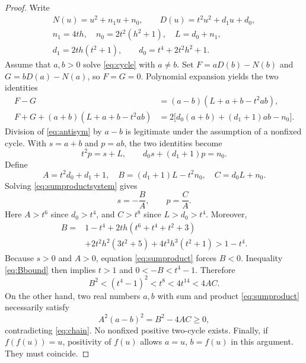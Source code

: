 \documentclass[11pt,a4paper]{article}
\numberwithin{equation}{section}
\begin{document}
\begin{proof}
Write
\begin{equation}
\begin{gathered}
 N(u)=u^2+n_1u+n_0,\qquad D(u)=t^2u^2+d_1u+d_0,\\
 n_1=4th,\quad n_0=2t^2(h^2+1),\quad L=d_0+n_1,\\
 d_1=2th(t^2+1),\qquad d_0=t^4+2t^2h^2+1.
\end{gathered}
\label{eq:coefficients}
\end{equation}
Assume that $a,b>0$ solve \eqref{eq:cycle} with $a\ne b$.
Set $F=aD(b)-N(b)$ and $G=bD(a)-N(a)$, so $F=G=0$.
Polynomial expansion yields the two identities
\begin{align}
 F-G&=(a-b)(L+a+b-t^2ab),\label{eq:antisym}\\
 F+G+(a+b)(L+a+b-t^2ab)
   &=2\bigl[d_0(a+b)+(d_1+1)ab-n_0\bigr].
 \label{eq:sym}
\end{align}
Division of \eqref{eq:antisym} by $a-b$ is legitimate under the
assumption of a nonfixed cycle. With $s=a+b$ and $p=ab$, the two
identities become
\begin{equation}
 t^2p=s+L,\qquad d_0s+(d_1+1)p=n_0.
 \label{eq:sumproductsystem}
\end{equation}
Define
\begin{equation}
 A=t^2d_0+d_1+1,\quad
 B=(d_1+1)L-t^2n_0,\quad
 C=d_0L+n_0.
 \label{eq:ABC}
\end{equation}
Solving \eqref{eq:sumproductsystem} gives
\begin{equation}
 s=-\frac{B}{A},\qquad p=\frac{C}{A}.
 \label{eq:sumproduct}
\end{equation}
Here $A>t^6$ since $d_0>t^4$, and $C>t^8$ since
$L>d_0>t^4$. Moreover,
\begin{equation}
\begin{split}
 B={}&1-t^4+2th(t^6+t^4+t^2+3)\\
    &+2t^2h^2(3t^2+5)+4t^3h^3(t^2+1)>1-t^4.
\end{split}
\label{eq:Bbound}
\end{equation}
Because $s>0$ and $A>0$, equation \eqref{eq:sumproduct} forces
$B<0$. Inequality \eqref{eq:Bbound} then implies $t>1$ and
$0<-B<t^4-1$. Therefore
\begin{equation}
 B^2<(t^4-1)^2<t^8<4t^{14}<4AC.
 \label{eq:chain}
\end{equation}
On the other hand, two real numbers $a,b$ with sum and product
\eqref{eq:sumproduct} necessarily satisfy
\begin{equation}
 A^2(a-b)^2=B^2-4AC\ge0,
 \label{eq:contradiction}
\end{equation}
contradicting \eqref{eq:chain}. No nonfixed positive two-cycle exists.
Finally, if $f(f(u))=u$, positivity of $f(u)$ allows
$a=u$, $b=f(u)$ in this argument. They must coincide.
\end{proof}
\end{document}
